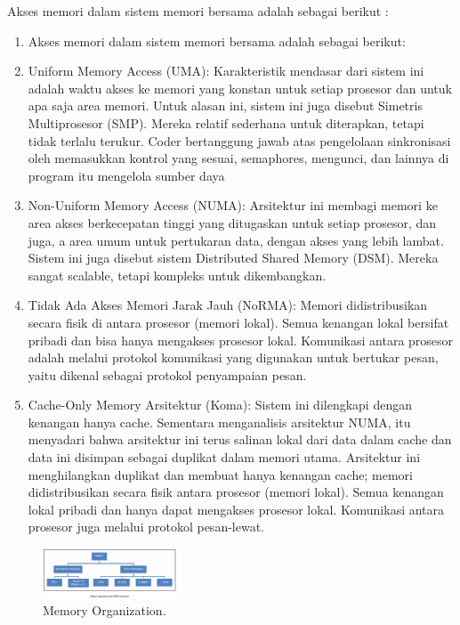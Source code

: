 Akses memori dalam sistem memori bersama adalah sebagai berikut :
\begin{enumerate}
\item Akses memori dalam sistem memori bersama adalah sebagai berikut: 
\item Uniform Memory Access (UMA): Karakteristik mendasar dari sistem ini adalah waktu akses ke memori yang konstan untuk setiap prosesor dan untuk apa saja area memori. Untuk alasan ini, sistem ini juga disebut Simetris Multiprosesor (SMP). Mereka relatif sederhana untuk diterapkan, tetapi tidak terlalu terukur. Coder bertanggung jawab atas pengelolaan sinkronisasi oleh memasukkan kontrol yang sesuai, semaphores, mengunci, dan lainnya di program itu mengelola sumber daya
\item Non-Uniform Memory Access (NUMA): Arsitektur ini membagi memori ke area akses berkecepatan tinggi yang ditugaskan untuk setiap prosesor, dan juga, a area umum untuk pertukaran data, dengan akses yang lebih lambat. Sistem ini juga disebut sistem Distributed Shared Memory (DSM). Mereka sangat scalable, tetapi kompleks untuk dikembangkan. 
\item Tidak Ada Akses Memori Jarak Jauh (NoRMA): Memori didistribusikan secara fisik di antara prosesor (memori lokal). Semua kenangan lokal bersifat pribadi dan bisa hanya mengakses prosesor lokal. Komunikasi antara prosesor adalah melalui protokol komunikasi yang digunakan untuk bertukar pesan, yaitu dikenal sebagai protokol penyampaian pesan.
\item Cache-Only Memory Arsitektur (Koma): Sistem ini dilengkapi dengan kenangan hanya cache. Sementara menganalisis arsitektur NUMA, itu menyadari bahwa arsitektur ini terus salinan lokal dari data dalam cache dan data ini disimpan sebagai duplikat dalam memori utama. Arsitektur ini menghilangkan duplikat dan membuat hanya kenangan cache; memori didistribusikan secara fisik antara prosesor (memori lokal). Semua kenangan lokal pribadi dan hanya dapat mengakses prosesor lokal. Komunikasi antara prosesor juga melalui protokol pesan-lewat.
\end{enumerate}
\begin{figure}[H]
	\includegraphics[width=4cm]{figures/kelompok2/chapter1/6.png}
	\centering
	\caption{Memory Organization.}
\end{figure}

